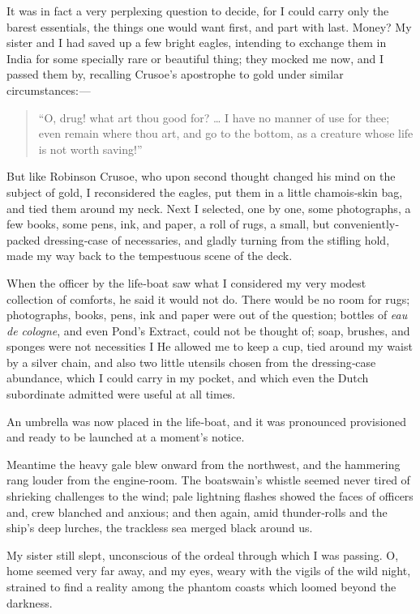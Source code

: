 \documentclass[12pt]{book}
\begin{document}
It was in fact a very perplexing question to decide, for I could carry only the
barest essentials, the things one would want first, and part with last. Money? My
sister and I had saved up a few bright eagles, intending to exchange them in India
for some specially rare or beautiful thing; they mocked me now, and I passed
them by, recalling Crusoe’s apostrophe to gold under similar circumstances: —

\begin{quote}
“O, drug! what art thou good for? … I have no manner of use for
thee; even remain where thou art, and go to the bottom, as a creature
whose life is not worth saving!”
\end{quote}

But like Robinson Crusoe, who upon second thought changed his mind on the
subject of gold, I reconsidered the eagles, put them in a little chamois‐skin bag, and
tied them around my neck. Next I selected, one by one, some photographs, a few
books, some pens, ink, and paper, a roll of rugs, a small, but conveniently‐packed
dressing‐case of necessaries, and gladly turning from the stifling hold, made my
way back to the tempestuous scene of the deck.

When the officer by the life‐boat saw what I considered my very modest
collection of comforts, he said it would not do. There would be no room for rugs;
photographs, books, pens, ink and paper were out of the question; bottles of
{\it eau de cologne}, and even Pond’s Extract, could not be thought of; soap, brushes, and
sponges were not necessities I He allowed me to keep a cup, tied around my waist
by a silver chain, and also two little utensils chosen from the dressing‐case abundance, which I could carry in my pocket, and which even the Dutch subordinate
admitted were useful at all times.

An umbrella was now placed in the life‐boat, and it was pronounced provisioned and ready to be launched at a moment’s notice.

Meantime the heavy gale blew onward from the northwest, and the hammering
rang louder from the engine‐room. The boatswain’s whistle seemed never tired
of shrieking challenges to the wind; pale lightning flashes showed the faces of
officers and, crew blanched and anxious; and then again, amid thunder‐rolls and
the ship’s deep lurches, the trackless sea merged black around us.

My sister still slept, unconscious of the ordeal through which I was passing.
O, home seemed very far away, and my eyes, weary with the vigils of the wild
night, strained to find a reality among the phantom coasts which loomed beyond
the darkness.
\end{document}
